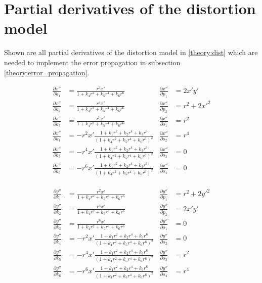 \chapter{Partial derivatives of the distortion model\label{app}}
Shown are all partial derivatives of the distortion model in \ref{theory:dist} which are needed to implement the error propagation in subsection \ref{theory:error_propagation}.

\begin{align*}
\frac{\partial x''}{\partial k_1}&=\frac{r^2 x'}{1+k_4 r^2+k_5 r^4+k_6 r^6}&\frac{\partial x''}{\partial p_1}&=2x'y'\\
\frac{\partial x''}{\partial k_2}&=\frac{r^4 x'}{1+k_4 r^2+k_5 r^4+k_6 r^6}&\frac{\partial x''}{\partial p_2}&=r^2+2x'^2\\
\frac{\partial x''}{\partial k_3}&=\frac{r^6 x'}{1+k_4 r^2+k_5 r^4+k_6 r^6}&\frac{\partial x''}{\partial s_1}&=r^2\\
\frac{\partial x''}{\partial k_4}&=-r^2x'\frac{1+k_1 r^2+k_2 r^4+k_3 r^6}{(1+k_4 r^2+k_5 r^4+k_6 r^6)^2}&\frac{\partial x''}{\partial s_2}&=r^4\\
\frac{\partial x''}{\partial k_5}&=-r^4x'\frac{1+k_1 r^2+k_2 r^4+k_3 r^6}{(1+k_4 r^2+k_5 r^4+k_6 r^6)^2}&\frac{\partial x''}{\partial s_3}&=0\\
\frac{\partial x''}{\partial k_6}&=-r^6x'\frac{1+k_1 r^2+k_2 r^4+k_3 r^6}{(1+k_4 r^2+k_5 r^4+k_6 r^6)^2}&\frac{\partial x''}{\partial s_4}&=0\\
\end{align*}

\begin{align*}
\frac{\partial y''}{\partial k_1}&=\frac{r^2 x'}{1+k_4 r^2+k_5 r^4+k_6 r^6}&\frac{\partial y''}{\partial p_1}&=r^2+2y'^2\\
\frac{\partial y''}{\partial k_2}&=\frac{r^4 x'}{1+k_4 r^2+k_5 r^4+k_6 r^6}&\frac{\partial y''}{\partial p_2}&=2x'y'\\
\frac{\partial y''}{\partial k_3}&=\frac{r^6 x'}{1+k_4 r^2+k_5 r^4+k_6 r^6}&\frac{\partial y''}{\partial s_1}&=0\\
\frac{\partial y''}{\partial k_4}&=-r^2x'\frac{1+k_1 r^2+k_2 r^4+k_3 r^6}{(1+k_4 r^2+k_5 r^4+k_6 r^6)^2}&\frac{\partial y''}{\partial s_2}&=0\\
\frac{\partial y''}{\partial k_5}&=-r^4x'\frac{1+k_1 r^2+k_2 r^4+k_3 r^6}{(1+k_4 r^2+k_5 r^4+k_6 r^6)^2}&\frac{\partial y''}{\partial s_3}&=r^2\\
\frac{\partial y''}{\partial k_6}&=-r^6x'\frac{1+k_1 r^2+k_2 r^4+k_3 r^6}{(1+k_4 r^2+k_5 r^4+k_6 r^6)^2}&\frac{\partial y''}{\partial s_4}&=r^4\\
\end{align*}


